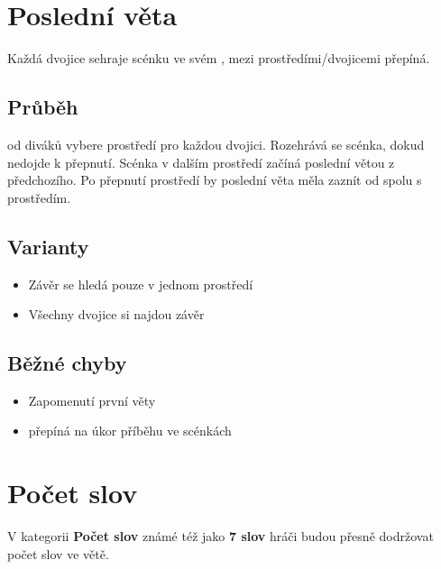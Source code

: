  
 
 
 
\needspace{5cm} \section{Poslední věta} \label{poslední věta}  
 
 
Každá dvojice sehraje scénku ve svém ,  mezi prostředími/dvojicemi přepíná. 
 
 
\subsection{Průběh}  od diváků vybere prostředí pro každou dvojici. Rozehrává se scénka, dokud nedojde k přepnutí. Scénka v dalším prostředí začíná poslední větou z předchozího. Po přepnutí prostředí by poslední věta měla zaznít od  spolu s prostředím. 
 
\subsection{ Varianty } \begin{itemize}
\item Závěr se hledá pouze v jednom prostředí
\item Všechny dvojice si najdou závěr
\end{itemize}
 
\subsection{ Běžné chyby } \begin{itemize}
\item Zapomenutí první věty
\item {} přepíná na úkor příběhu ve scénkách
\end{itemize}
 
 
 
 
 
\needspace{5cm} \section{Počet slov} \label{počet slov}  
 
 
V kategorii \textbf{Počet slov}{} známé též jako \textbf{7 slov}{} hráči  budou přesně dodržovat počet slov ve větě. 
